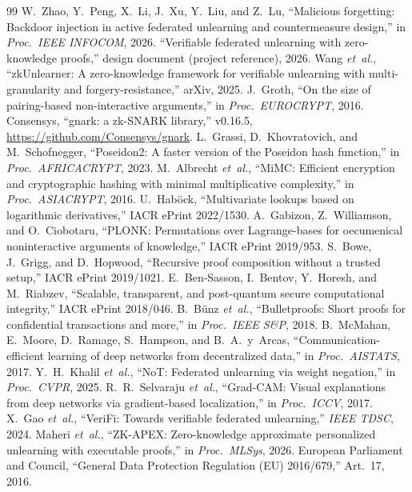 \documentclass[conference]{IEEEtran}
\begin{document}
\begin{thebibliography}{99}
 W.~Zhao, Y.~Peng, X.~Li, J.~Xu, Y.~Liu, and Z.~Lu, ``Malicious forgetting: Backdoor injection in active federated unlearning and countermeasure design,'' in \emph{Proc.\ IEEE INFOCOM}, 2026.
 ``Verifiable federated unlearning with zero-knowledge proofs,'' design document (project reference), 2026.
 Wang \emph{et~al.}, ``zkUnlearner: A zero-knowledge framework for verifiable unlearning with multi-granularity and forgery-resistance,'' arXiv, 2025.
 J.~Groth, ``On the size of pairing-based non-interactive arguments,'' in \emph{Proc.\ EUROCRYPT}, 2016.
 Consensys, ``gnark: a zk-SNARK library,'' v0.16.5, \url{https://github.com/Consensys/gnark}.
 L.~Grassi, D.~Khovratovich, and M.~Schofnegger, ``Poseidon2: A faster version of the Poseidon hash function,'' in \emph{Proc.\ AFRICACRYPT}, 2023.
 M.~Albrecht \emph{et~al.}, ``MiMC: Efficient encryption and cryptographic hashing with minimal multiplicative complexity,'' in \emph{Proc.\ ASIACRYPT}, 2016.
 U.~Hab\"ock, ``Multivariate lookups based on logarithmic derivatives,'' IACR ePrint 2022/1530.
 A.~Gabizon, Z.~Williamson, and O.~Ciobotaru, ``PLONK: Permutations over Lagrange-bases for oecumenical noninteractive arguments of knowledge,'' IACR ePrint 2019/953.
 S.~Bowe, J.~Grigg, and D.~Hopwood, ``Recursive proof composition without a trusted setup,'' IACR ePrint 2019/1021.
 E.~Ben-Sasson, I.~Bentov, Y.~Horesh, and M.~Riabzev, ``Scalable, transparent, and post-quantum secure computational integrity,'' IACR ePrint 2018/046.
 B.~B\"unz \emph{et~al.}, ``Bulletproofs: Short proofs for confidential transactions and more,'' in \emph{Proc.\ IEEE S\&P}, 2018.
 B.~McMahan, E.~Moore, D.~Ramage, S.~Hampson, and B.~A.~y~Arcas, ``Communication-efficient learning of deep networks from decentralized data,'' in \emph{Proc.\ AISTATS}, 2017.
 Y.~H.~Khalil \emph{et~al.}, ``NoT: Federated unlearning via weight negation,'' in \emph{Proc.\ CVPR}, 2025.
 R.~R.~Selvaraju \emph{et~al.}, ``Grad-CAM: Visual explanations from deep networks via gradient-based localization,'' in \emph{Proc.\ ICCV}, 2017.
 X.~Gao \emph{et~al.}, ``VeriFi: Towards verifiable federated unlearning,'' \emph{IEEE TDSC}, 2024.
 Maheri \emph{et~al.}, ``ZK-APEX: Zero-knowledge approximate personalized unlearning with executable proofs,'' in \emph{Proc.\ MLSys}, 2026.
 European Parliament and Council, ``General Data Protection Regulation (EU) 2016/679,'' Art.~17, 2016.
\end{thebibliography}
\end{document}
